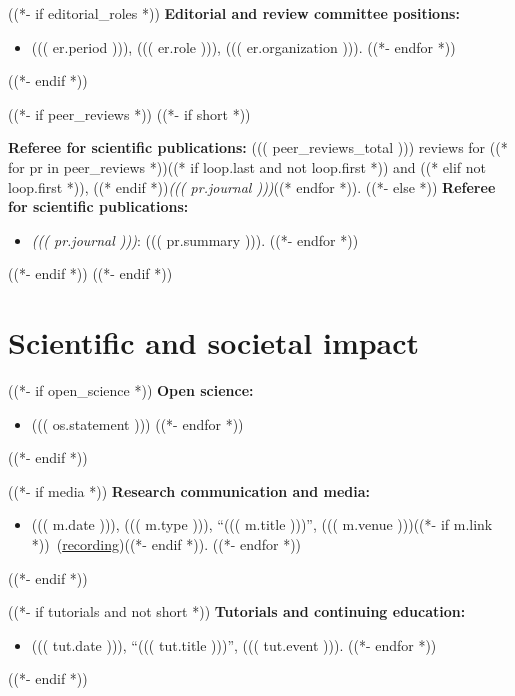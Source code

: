 \documentclass[a4paper,12pt]{article}
\begin{document}
((*- if editorial_roles *))
\medskip
\textbf{Editorial and review committee positions:}
\begin{itemize}
((*- for er in editorial_roles *))
\item ((( er.period ))), ((( er.role ))), ((( er.organization ))).
((*- endfor *))
\end{itemize}
((*- endif *))

((*- if peer_reviews *))
\medskip
((*- if short *))

\textbf{Referee for scientific publications:} ((( peer_reviews_total ))) reviews for ((* for pr in peer_reviews *))((* if loop.last and not loop.first *)) and ((* elif not loop.first *)), ((* endif *))\textit{((( pr.journal )))}((* endfor *)).
((*- else *))
\textbf{Referee for scientific publications:}
\begin{itemize}
((*- for pr in peer_reviews *))
\item \textit{((( pr.journal )))}: ((( pr.summary ))).
((*- endfor *))
\end{itemize}
((*- endif *))
((*- endif *))

\section*{Scientific and societal impact}

((*- if open_science *))
\medskip
\textbf{Open science:}
\begin{itemize}
((*- for os in open_science *))
\item ((( os.statement )))
((*- endfor *))
\end{itemize}
((*- endif *))

((*- if media *))
\medskip
\textbf{Research communication and media:}
\begin{itemize}
((*- for m in media *))
\item ((( m.date ))), ((( m.type ))), ``((( m.title )))'', ((( m.venue )))((*- if m.link *))~(\href{((( m.link )))}{recording})((*- endif *)).
((*- endfor *))
\end{itemize}
((*- endif *))

((*- if tutorials and not short *))
\medskip
\textbf{Tutorials and continuing education:}
\begin{itemize}
((*- for tut in tutorials *))
\item ((( tut.date ))), ``((( tut.title )))'', ((( tut.event ))).
((*- endfor *))
\end{itemize}
((*- endif *))
\end{document}

